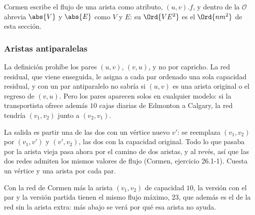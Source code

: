 \documentclass[11pt,letterpaper]{article}
\begin{document}
\begin{observacion}
  Cormen escribe el flujo de una arista como atributo, $(u, v).f$, y
  dentro de la $\mathcal{O}$ abrevia $\abs{V}$ y $\abs{E}$ como $V$ y
  $E$: su $\Ord{VE^2}$ es el $\Ord{n m^2}$ de esta sección.
\end{observacion}

\subsubsection*{Aristas antiparalelas}

La definición prohíbe los pares $(u, v)$, $(v, u)$, y no por capricho.
La red residual, que viene enseguida, le asigna a cada par ordenado
una sola capacidad residual, y con un par antiparalelo no sabría si
$(u, v)$ es una arista original o el regreso de $(v, u)$. Pero los
pares aparecen solos en cualquier modelo: si la transportista ofrece
además $10$ cajas diarias de Edmonton a Calgary, la red tendría
$(v_1, v_2)$ junto a $(v_2, v_1)$.

La salida es partir una de las dos con un vértice nuevo $v'$: se
reemplaza $(v_1, v_2)$ por $(v_1, v')$ y $(v', v_2)$, las dos con la
capacidad original. Todo lo que pasaba por la arista vieja pasa ahora
por el camino de dos aristas, y al revés, así que las dos redes
admiten los mismos valores de flujo (Cormen, ejercicio 26.1-1).
Cuesta un vértice y una arista por cada par.

\begin{center}
\hspace{1.5cm}
\end{center}

Con la red de Cormen más la arista $(v_1, v_2)$ de capacidad $10$, la
versión con el par y la versión partida tienen el mismo flujo máximo,
$23$, que además es el de la red sin la arista extra: más abajo se
verá por qué esa arista no ayuda.
\end{document}
